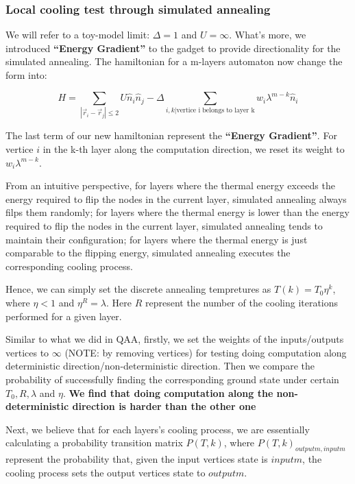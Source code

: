 \documentclass[twocolumn,superscriptaddress,english,showpacs,longbibliography]{revtex4-2}
\begin{document}
\subsubsection{Local cooling test through simulated
annealing}\label{local-cooling-test-through-simulated-annealing}

We will refer to a toy-model limit: $\Delta = 1$ and $U = \infty$.
What's more, we introduced \textbf{``Energy Gradient''} to the gadget to
provide directionality for the simulated annealing. The hamiltonian for
a m-layers automaton now change the form into:

\[
H = \sum_{|\vec r_i - \vec r_j|\leq 2} U \hat n_i \hat n_j  - \Delta \sum_{i,k|\text{vertice i belongs to layer k}} w_i \lambda^{m-k} \hat n_i
\]

The last term of our new hamiltonian represent the \textbf{``Energy
Gradient''}. For vertice $i$ in the k-th layer along the computation
direction, we reset its weight to $w_i\lambda^{m-k}$.

From an intuitive perspective, for layers where the thermal energy
exceeds the energy required to flip the nodes in the current layer,
simulated annealing always filps them randomly; for layers where the
thermal energy is lower than the energy required to flip the nodes in
the current layer, simulated annealing tends to maintain their
configuration; for layers where the thermal energy is just comparable to
the flipping energy, simulated annealing executes the corresponding
cooling process.

Hence, we can simply set the discrete annealing tempretures as
$T(k) = T_0 \eta^k$, where $\eta < 1$ and $\eta ^R = \lambda$.
Here $R$ represent the number of the cooling iterations performed for
a given layer.

Similar to what we did in QAA, firstly, we set the weights of the
inputs/outputs vertices to $\infty$ (NOTE: by removing vertices) for
testing doing computation along deterministic
direction/non-deterministic direction. Then we compare the probability
of successfully finding the corresponding ground state under certain
$T_0, R, \lambda$ and $\eta$. \textbf{We find that doing computation
along the non-deterministic direction is harder than the other one}

Next, we believe that for each layers's cooling process, we are
essentially calculating a probability transition matrix $P(T,k)$,
where $P(T,k)_{outputm, inputm}$ represent the probability that, given
the input vertices state is $inputm$, the cooling process sets the
output vertices state to $outputm$.
\end{document}
